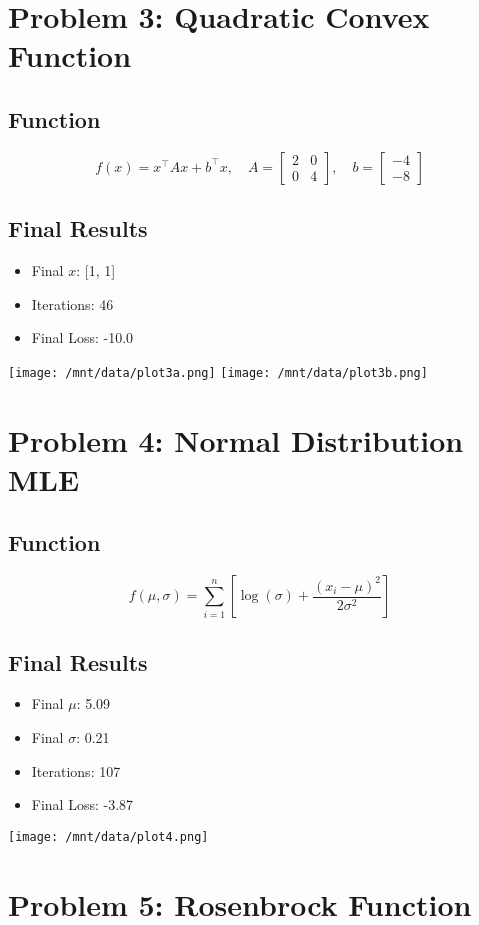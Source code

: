 \documentclass{article}
\begin{document}
\section*{Problem 3: Quadratic Convex Function}
\subsection*{Function}
\[
f(x) = x^\top A x + b^\top x,\quad A = \begin{bmatrix} 2 & 0 \\ 0 & 4 \end{bmatrix},\quad b = \begin{bmatrix} -4 \\ -8 \end{bmatrix}
\]
\subsection*{Final Results}
\begin{itemize}
    \item Final $x$: [1, 1]
    \item Iterations: 46
    \item Final Loss: -10.0
\end{itemize}
\texttt{[image: /mnt/data/plot3a.png]}
\texttt{[image: /mnt/data/plot3b.png]}

\section*{Problem 4: Normal Distribution MLE}
\subsection*{Function}
\[
f(\mu, \sigma) = \sum_{i=1}^n \left[\log(\sigma) + \frac{(x_i - \mu)^2}{2\sigma^2}\right]
\]
\subsection*{Final Results}
\begin{itemize}
    \item Final $\mu$: 5.09
    \item Final $\sigma$: 0.21
    \item Iterations: 107
    \item Final Loss: -3.87
\end{itemize}
\texttt{[image: /mnt/data/plot4.png]}

\section*{Problem 5: Rosenbrock Function}
\end{document}
